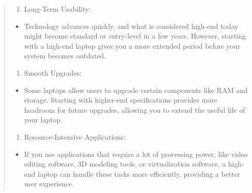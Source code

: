 \documentclass[14pt, letterpaper,twoside]{extreport}
\begin{document}
\begin{quote}
	\begin{enumerate}
		\def\labelenumi{\arabic{enumi}.}
		\setcounter{enumi}{3}

		\item
		      Long-Term Usability:
	\end{enumerate}

	\begin{itemize}

		\item
		      Technology advances quickly, and what is considered high-end today might become standard or entry-level in a few years. However, starting with a high-end laptop gives you a more extended period before your system becomes outdated.
	\end{itemize}

	\begin{enumerate}
		\def\labelenumi{\arabic{enumi}.}
		\setcounter{enumi}{4}

		\item
		      Smooth Upgrades:
	\end{enumerate}

	\begin{itemize}

		\item
		      Some laptops allow users to upgrade certain components like RAM and storage. Starting with higher-end specifications provides more headroom for future upgrades, allowing you to extend the useful life of your laptop.
	\end{itemize}

	\begin{enumerate}
		\def\labelenumi{\arabic{enumi}.}
		\setcounter{enumi}{5}

		\item
		      Resource-Intensive Applications:
	\end{enumerate}

	\begin{itemize}

		\item
		      If you use applications that require a lot of processing power, like video editing software, 3D modeling tools, or virtualization software, a high-end laptop can handle these tasks more efficiently, providing a better user experience.
	\end{itemize}

	\begin{enumerate}
		\def\labelenumi{\arabic{enumi}.}
		\setcounter{enumi}{6}


\end{enumerate}
\end{quote}
\end{document}
